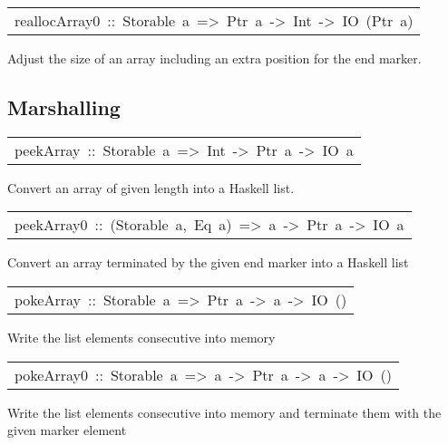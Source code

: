 \begin{haddockdesc}
\item[\begin{tabular}{@{}l}
reallocArray0\ ::\ Storable\ a\ =>\ Ptr\ a\ ->\ Int\ ->\ IO\ (Ptr\ a)
\end{tabular}]\haddockbegindoc
Adjust the size of an array including an extra position for the end marker.
\par

\end{haddockdesc}
\subsection{Marshalling
}
\begin{haddockdesc}
\item[\begin{tabular}{@{}l}
peekArray\ ::\ Storable\ a\ =>\ Int\ ->\ Ptr\ a\ ->\ IO\ {\char 91}a{\char 93}
\end{tabular}]\haddockbegindoc
Convert an array of given length into a Haskell list.
\par

\end{haddockdesc}
\begin{haddockdesc}
\item[\begin{tabular}{@{}l}
peekArray0\ ::\ (Storable\ a,\ Eq\ a)\ =>\ a\ ->\ Ptr\ a\ ->\ IO\ {\char 91}a{\char 93}
\end{tabular}]\haddockbegindoc
Convert an array terminated by the given end marker into a Haskell list
\par

\end{haddockdesc}
\begin{haddockdesc}
\item[\begin{tabular}{@{}l}
pokeArray\ ::\ Storable\ a\ =>\ Ptr\ a\ ->\ {\char 91}a{\char 93}\ ->\ IO\ ()
\end{tabular}]\haddockbegindoc
Write the list elements consecutive into memory
\par

\end{haddockdesc}
\begin{haddockdesc}
\item[\begin{tabular}{@{}l}
pokeArray0\ ::\ Storable\ a\ =>\ a\ ->\ Ptr\ a\ ->\ {\char 91}a{\char 93}\ ->\ IO\ ()
\end{tabular}]\haddockbegindoc
Write the list elements consecutive into memory and terminate them with the
 given marker element
\par

\end{haddockdesc}
